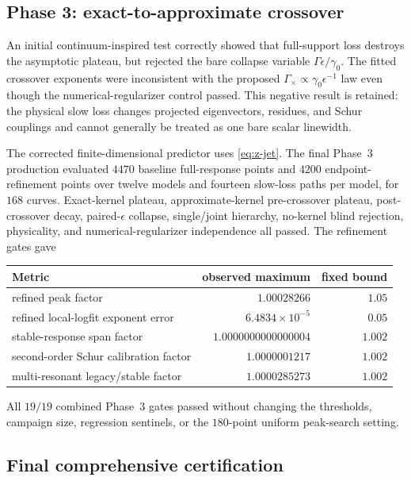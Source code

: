 \documentclass[11pt]{article}
\theoremstyle{definition}
\theoremstyle{remark}
\begin{document}
\subsection{Phase 3: exact-to-approximate crossover}

An initial continuum-inspired test correctly showed that full-support loss destroys the asymptotic plateau, but rejected the bare collapse variable $\Gamma\epsilon/\gamma_0$.  The fitted crossover exponents were inconsistent with the proposed $\Gamma_\times\propto\gamma_0\epsilon^{-1}$ law even though the numerical-regularizer control passed.  This negative result is retained: the physical slow loss changes projected eigenvectors, residues, and Schur couplings and cannot generally be treated as one bare scalar linewidth.

The corrected finite-dimensional predictor uses \eqref{eq:z-jet}.  The final Phase~3 production evaluated $4470$ baseline full-response points and $4200$ endpoint-refinement points over twelve models and fourteen slow-loss paths per model, for $168$ curves.  Exact-kernel plateau, approximate-kernel pre-crossover plateau, post-crossover decay, paired-$\epsilon$ collapse, single/joint hierarchy, no-kernel blind rejection, physicality, and numerical-regularizer independence all passed.  The refinement gates gave
\begin{center}
\begin{tabular}{lrr}
\toprule
Metric & observed maximum & fixed bound\\
\midrule
refined peak factor & $1.00028266$ & $1.05$\\
refined local-logfit exponent error & $6.4834\times10^{-5}$ & $0.05$\\
stable-response span factor & $1.0000000000000004$ & $1.002$\\
second-order Schur calibration factor & $1.0000001217$ & $1.002$\\
multi-resonant legacy/stable factor & $1.0000285273$ & $1.002$\\
\bottomrule
\end{tabular}
\end{center}
All $19/19$ combined Phase~3 gates passed without changing the thresholds, campaign size, regression sentinels, or the $180$-point uniform peak-search setting.

\subsection{Final comprehensive certification}
\end{document}
